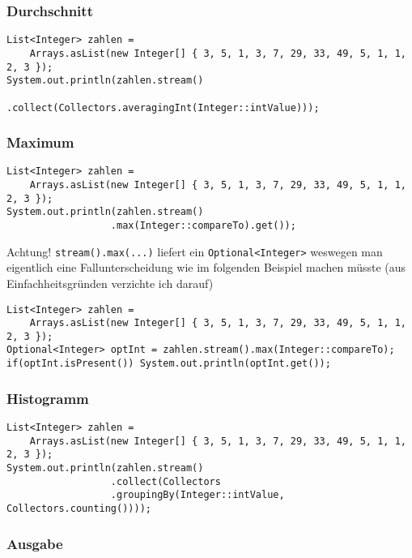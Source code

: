 \subsubsection{Durchschnitt}\label{durchschnitt}

\begin{verbatim}
List<Integer> zahlen = 
    Arrays.asList(new Integer[] { 3, 5, 1, 3, 7, 29, 33, 49, 5, 1, 1, 2, 3 });
System.out.println(zahlen.stream()
                  .collect(Collectors.averagingInt(Integer::intValue)));
\end{verbatim}

\subsubsection{Maximum}\label{maximum}

\begin{verbatim}
List<Integer> zahlen =
    Arrays.asList(new Integer[] { 3, 5, 1, 3, 7, 29, 33, 49, 5, 1, 1, 2, 3 });
System.out.println(zahlen.stream()
                  .max(Integer::compareTo).get());
\end{verbatim}

Achtung! \texttt{stream().max(...)} liefert ein
\texttt{Optional\textless{}Integer\textgreater{}} weswegen man
eigentlich eine Fallunterscheidung wie im folgenden Beispiel machen
müsste (aus Einfachheitsgründen verzichte ich darauf)

\begin{verbatim}
List<Integer> zahlen =
    Arrays.asList(new Integer[] { 3, 5, 1, 3, 7, 29, 33, 49, 5, 1, 1, 2, 3 });
Optional<Integer> optInt = zahlen.stream().max(Integer::compareTo);
if(optInt.isPresent()) System.out.println(optInt.get());
\end{verbatim}

\subsubsection{Histogramm}\label{histogramm}

\begin{verbatim}
List<Integer> zahlen =
    Arrays.asList(new Integer[] { 3, 5, 1, 3, 7, 29, 33, 49, 5, 1, 1, 2, 3 });
System.out.println(zahlen.stream()
                  .collect(Collectors
                  .groupingBy(Integer::intValue, Collectors.counting())));
\end{verbatim}

\subsubsection{Ausgabe}\label{ausgabe}

